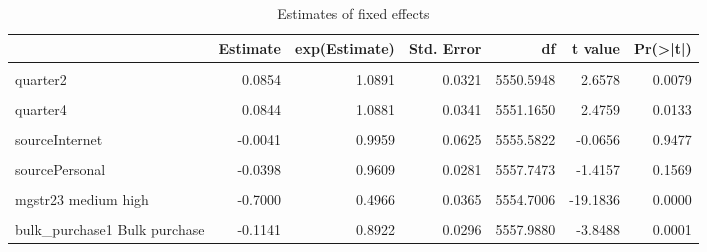 \documentclass[
  11pt,
]{article}
\begin{document}
\begin{table}[!h]

\caption{\label{tab:unnamed-chunk-33}Estimates of fixed effects}
\centering
\begin{tabular}[t]{l|r|r|r|r|r|r}
\hline
  & Estimate & exp(Estimate) & Std. Error & df & t value & Pr(>|t|)\\
\hline
\cellcolor{gray!6}{(Intercept)} & \cellcolor{gray!6}{-0.6346} & \cellcolor{gray!6}{0.5301} & \cellcolor{gray!6}{0.0393} & \cellcolor{gray!6}{296.1819} & \cellcolor{gray!6}{-16.1290} & \cellcolor{gray!6}{0.0000}\\
\hline
quarter2 & 0.0854 & 1.0891 & 0.0321 & 5550.5948 & 2.6578 & 0.0079\\
\hline
\cellcolor{gray!6}{quarter3} & \cellcolor{gray!6}{0.0841} & \cellcolor{gray!6}{1.0877} & \cellcolor{gray!6}{0.0332} & \cellcolor{gray!6}{5555.0726} & \cellcolor{gray!6}{2.5349} & \cellcolor{gray!6}{0.0113}\\
\hline
quarter4 & 0.0844 & 1.0881 & 0.0341 & 5551.1650 & 2.4759 & 0.0133\\
\hline
\cellcolor{gray!6}{sourceHeard it} & \cellcolor{gray!6}{0.0633} & \cellcolor{gray!6}{1.0653} & \cellcolor{gray!6}{0.0335} & \cellcolor{gray!6}{5556.1197} & \cellcolor{gray!6}{1.8904} & \cellcolor{gray!6}{0.0588}\\
\hline
sourceInternet & -0.0041 & 0.9959 & 0.0625 & 5555.5822 & -0.0656 & 0.9477\\
\hline
\cellcolor{gray!6}{sourceInternet Pharmacy} & \cellcolor{gray!6}{-0.3227} & \cellcolor{gray!6}{0.7242} & \cellcolor{gray!6}{0.1016} & \cellcolor{gray!6}{5548.9347} & \cellcolor{gray!6}{-3.1743} & \cellcolor{gray!6}{0.0015}\\
\hline
sourcePersonal & -0.0398 & 0.9609 & 0.0281 & 5557.7473 & -1.4157 & 0.1569\\
\hline
\cellcolor{gray!6}{mgstr22 medium} & \cellcolor{gray!6}{-0.3816} & \cellcolor{gray!6}{0.6827} & \cellcolor{gray!6}{0.0279} & \cellcolor{gray!6}{5549.1951} & \cellcolor{gray!6}{-13.6631} & \cellcolor{gray!6}{0.0000}\\
\hline
mgstr23 medium high & -0.7000 & 0.4966 & 0.0365 & 5554.7006 & -19.1836 & 0.0000\\
\hline
\cellcolor{gray!6}{mgstr24 high} & \cellcolor{gray!6}{-1.1197} & \cellcolor{gray!6}{0.3264} & \cellcolor{gray!6}{0.0420} & \cellcolor{gray!6}{5559.7107} & \cellcolor{gray!6}{-26.6889} & \cellcolor{gray!6}{0.0000}\\
\hline
bulk\_purchase1 Bulk purchase & -0.1141 & 0.8922 & 0.0296 & 5557.9880 & -3.8488 & 0.0001\\
\hline
\end{tabular}
\end{table}
\end{document}
